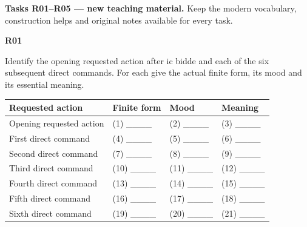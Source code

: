 \par\begin{minipage}{\linewidth}\raggedright
\textbf{Tasks R01–R05 — new teaching material.} Keep the modern vocabulary, construction helps and original notes available for every task.


\textbf{R01}

Identify the opening requested action after ic bidde and each of the six subsequent direct commands. For each give the actual finite form, its mood and its essential meaning.

\par\begingroup
\fontsize{10.5}{13.2}\selectfont
\setlength{\LTleft}{0pt}\setlength{\LTright}{\fill}
\noindent
\begin{tabular}{@{}>{\raggedright\arraybackslash}p{39.78mm}>{\raggedright\arraybackslash}p{25.26mm}>{\raggedright\arraybackslash}p{25.26mm}>{\raggedright\arraybackslash}p{25.26mm}@{}}
\toprule
\textbf{Requested action} & \textbf{Finite form} & \textbf{Mood} & \textbf{Meaning} \\
\midrule
Opening requested action & (1) \_\_\_\_ & (2) \_\_\_\_ & (3) \_\_\_\_ \\
First direct command & (4) \_\_\_\_ & (5) \_\_\_\_ & (6) \_\_\_\_ \\
Second direct command & (7) \_\_\_\_ & (8) \_\_\_\_ & (9) \_\_\_\_ \\
Third direct command & (10) \_\_\_\_ & (11) \_\_\_\_ & (12) \_\_\_\_ \\
Fourth direct command & (13) \_\_\_\_ & (14) \_\_\_\_ & (15) \_\_\_\_ \\
Fifth direct command & (16) \_\_\_\_ & (17) \_\_\_\_ & (18) \_\_\_\_ \\
Sixth direct command & (19) \_\_\_\_ & (20) \_\_\_\_ & (21) \_\_\_\_ \\
\bottomrule
\end{tabular}
\par\endgroup

\end{minipage}\par\addvspace{4pt}

